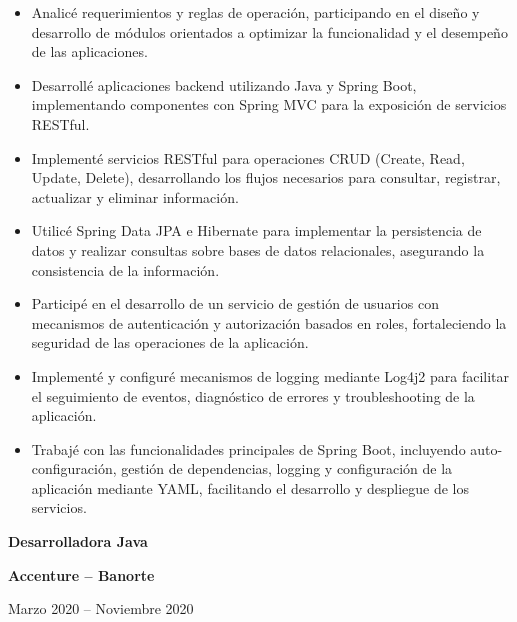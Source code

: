 \documentclass[10pt,letterpaper]{article}
\newcommand{\jobtitle}[1]{
    {\bfseries #1}
}
\newcommand{\company}[1]{
    {\bfseries\color{DarkGray} #1}
}
\newcommand{\jobdate}[1]{
    {\color{MediumGray} #1}
}
\begin{document}
\begin{itemize}

\item Analicé requerimientos y reglas de operación, participando en el diseño y desarrollo de módulos orientados a optimizar la funcionalidad y el desempeño de las aplicaciones.

\item Desarrollé aplicaciones backend utilizando Java y Spring Boot, implementando componentes con Spring MVC para la exposición de servicios RESTful.

\item Implementé servicios RESTful para operaciones CRUD (Create, Read, Update, Delete), desarrollando los flujos necesarios para consultar, registrar, actualizar y eliminar información.

\item Utilicé Spring Data JPA e Hibernate para implementar la persistencia de datos y realizar consultas sobre bases de datos relacionales, asegurando la consistencia de la información.

\item Participé en el desarrollo de un servicio de gestión de usuarios con mecanismos de autenticación y autorización basados en roles, fortaleciendo la seguridad de las operaciones de la aplicación.

\item Implementé y configuré mecanismos de logging mediante Log4j2 para facilitar el seguimiento de eventos, diagnóstico de errores y troubleshooting de la aplicación.

\item Trabajé con las funcionalidades principales de Spring Boot, incluyendo auto-configuración, gestión de dependencias, logging y configuración de la aplicación mediante YAML, facilitando el desarrollo y despliegue de los servicios.

\end{itemize}


\jobtitle{Desarrolladora Java} \textbar{}
\company{Accenture -- Banorte}
\hfill \textbar{}
\jobdate{Marzo 2020 -- Noviembre 2020}
\end{document}
